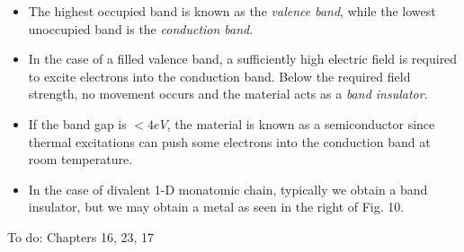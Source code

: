 \documentclass[10pt]{article}
\begin{document}
\begin{itemize}
\begin{figure}
{       higher energy band were to be lifted, an indirect band gap would be obtained.}
  \end{figure}
  \item The highest occupied band is known as the \emph{valence band}, while the lowest unoccupied band is the \emph{conduction band}.
  \item In the case of a filled valence band, a sufficiently high electric field is required to excite electrons into the conduction band.
  Below the required field strength, no movement occurs and the material acts as a \emph{band insulator}.
  \item If the band gap is $< 4eV$, the material is known as a semiconductor since thermal excitations can push some electrons into the
  conduction band at room temperature.
  \item In the case of divalent 1-D monatomic chain, typically we obtain a band insulator, but we may obtain a metal as seen in the right of Fig. 10.
\end{itemize}

To do: Chapters 16, 23, 17
\end{document}
